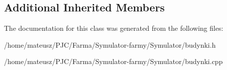 \subsection*{Additional Inherited Members}


The documentation for this class was generated from the following files\+:\begin{DoxyCompactItemize}
\item 
/home/mateusz/\+P\+J\+C/\+Farma/\+Symulator-\/farmy/\+Symulator/budynki.\+h\item 
/home/mateusz/\+P\+J\+C/\+Farma/\+Symulator-\/farmy/\+Symulator/budynki.\+cpp\end{DoxyCompactItemize}
